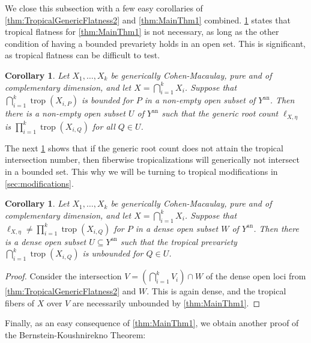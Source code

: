 \documentclass[12pt,reqno,a4paper]{amsart}
\theoremstyle{theoremstyle}
\newtheorem{corollary}[theorem]{Corollary}
\theoremstyle{examplestyle}
\theoremstyle{algorithmstyle}
\DeclareMathOperator{\trop}{trop}
\begin{document}
We close this subsection with a few easy corollaries of \cref{thm:TropicalGenericFlatness2} and \cref{thm:MainThm1} combined.
\cref{cor:CombineGenericandMain} states that tropical flatness for \cref{thm:MainThm1} is not necessary, as long as the other condition of having a bounded prevariety holds in an open set.  This is significant, as tropical flatness can be difficult to test.

\begin{corollary}\label{cor:CombineGenericandMain}
  Let $X_1,\dots,X_k$ be generically Cohen-Macaulay, pure and of complementary dimension, and let $X=\bigcap_{i=1}^k X_i$.
  Suppose that $\bigcap_{i=1}^{k}\trop(X_{i,P})$ is bounded for $P$ in a non-empty open subset of $Y^{\mathrm{an}}$.
  Then there is a non-empty open subset $U$ of $Y^{\mathrm{an}}$ such that the generic root count $\ell_{X,\eta}$ is $\prod_{i=1}^{k}\trop(X_{i,Q})$ for all $Q\in{U}$.
\end{corollary}

The next \cref{cor:NoBoundedTrop} shows that if the generic root count does not attain the tropical intersection number, then fiberwise tropicalizations will generically not %
intersect in a bounded set.
This why we will be turning to tropical modifications in \cref{sec:modifications}.

\begin{corollary}\label{cor:NoBoundedTrop}
  Let $X_1,\dots,X_k$ be generically Cohen-Macaulay, pure and of complementary dimension, and let $X=\bigcap_{i=1}^k X_i$.  Suppose that $\ell_{X,\eta}\neq \prod_{i=1}^{k}\trop(X_{i,Q})$ for $P$ in a dense open subset $W$ of $Y^{\mathrm{an}}$. Then there is a dense open subset $U\subseteq Y^{\mathrm{an}}$ such that the tropical prevariety $\bigcap_{i=1}^{k}\trop(X_{i,Q})$ is unbounded for $Q\in U$.
\end{corollary}
\begin{proof}
  Consider the intersection $V=(\bigcap_{i=1}^{k} V_{i})\cap W$ of the dense open loci from \cref{thm:TropicalGenericFlatness2} and $W$. This is again dense, and the tropical fibers of $X$ over $V$ are necessarily unbounded by \cref{thm:MainThm1}.
\end{proof}

Finally, as an easy consequence of \cref{thm:MainThm1}, we obtain another proof of the Bernstein-Koushnirekno Theorem:
\end{document}
